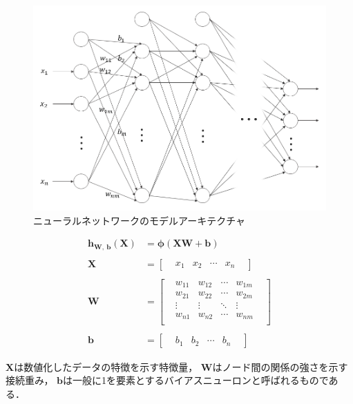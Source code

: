 \documentclass[12pt,a4j]{jreport}
\begin{document}
\begin{figure}[H]
	\centering
	\includegraphics[keepaspectratio, width=120mm]{img/nn.png}
	\caption{ニューラルネットワークのモデルアーキテクチャ}
	\label{fig_nn}
\end{figure}

\begin{align}
  \bm{h}_{\bm{W},~ \bm{b}}(\bm{X}) &= \bm{\phi}(\bm{X}\bm{W} + \bm{b}) \label{nn_layer}
  \\
  \nonumber
  \\
  \bm{X} &= 
  \begin{bmatrix}
    & x_1 & x_2 & \cdots & x_n  &
  \end{bmatrix}
  \label{nn_x}
  \\
  \nonumber
  \\
  \bm{W} &=
  \begin{bmatrix}
    & w_{11} & w_{12} & \cdots & w_{1m} & \\
    & w_{21} & w_{22} & \cdots & w_{2m} & \\
    & \vdots & \vdots & \ddots & \vdots & \\
    & w_{n1} & w_{n2} & \cdots & w_{nm} & \\
  \end{bmatrix}
  \label{nn_w}
  \\
  \nonumber
  \\
  \bm{b} &=
  \begin{bmatrix}
    & b_1 & b_2 & \cdots & b_n  &
  \end{bmatrix}
  \label{nn_b}
\end{align}

$\bm{X}$は数値化したデータの特徴を示す特徴量，
$\bm{W}$はノード間の関係の強さを示す接続重み，
$\bm{b}$は一般に1を要素とするバイアスニューロンと呼ばれるものである．
\end{document}
